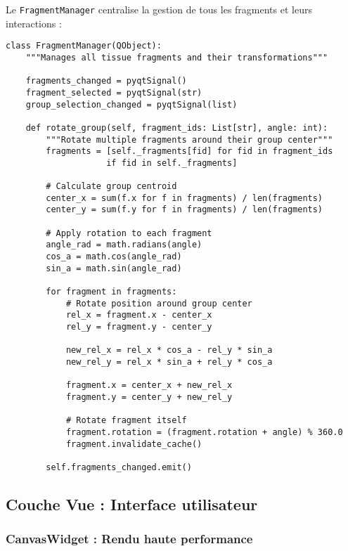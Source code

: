 \documentclass[12pt,a4paper]{report}
\begin{document}
Le \texttt{FragmentManager} centralise la gestion de tous les fragments et leurs interactions :

\begin{lstlisting}[caption=Méthodes clés du FragmentManager]
class FragmentManager(QObject):
    """Manages all tissue fragments and their transformations"""
    
    fragments_changed = pyqtSignal()
    fragment_selected = pyqtSignal(str)
    group_selection_changed = pyqtSignal(list)
    
    def rotate_group(self, fragment_ids: List[str], angle: int):
        """Rotate multiple fragments around their group center"""
        fragments = [self._fragments[fid] for fid in fragment_ids 
                    if fid in self._fragments]
        
        # Calculate group centroid
        center_x = sum(f.x for f in fragments) / len(fragments)
        center_y = sum(f.y for f in fragments) / len(fragments)
        
        # Apply rotation to each fragment
        angle_rad = math.radians(angle)
        cos_a = math.cos(angle_rad)
        sin_a = math.sin(angle_rad)
        
        for fragment in fragments:
            # Rotate position around group center
            rel_x = fragment.x - center_x
            rel_y = fragment.y - center_y
            
            new_rel_x = rel_x * cos_a - rel_y * sin_a
            new_rel_y = rel_x * sin_a + rel_y * cos_a
            
            fragment.x = center_x + new_rel_x
            fragment.y = center_y + new_rel_y
            
            # Rotate fragment itself
            fragment.rotation = (fragment.rotation + angle) % 360.0
            fragment.invalidate_cache()
        
        self.fragments_changed.emit()
\end{lstlisting}

\subsection{Couche Vue : Interface utilisateur}

\subsubsection{CanvasWidget : Rendu haute performance}
\end{document}
